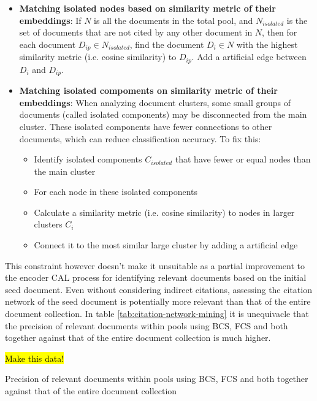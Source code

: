 \documentclass[10pt, english]{article}
\begin{document}
\begin{itemize}
    \item \textbf{Matching isolated nodes based on similarity metric of their embeddings}: If $N$ is all the documents in the total pool, and $N_{isolated}$ is the set of documents that are not cited by any other document in $N$, then for each document $D_{ip} \in N_{isolated}$, find the document $D_i \in N$ with the highest similarity metric (i.e. cosine similarity) to $D_{ip}$. Add a artificial edge between $D_i$ and $D_{ip}$.
    \item \textbf{Matching isolated compoments on similarity metric of their embeddings}: When analyzing document clusters, some small groups of documents (called isolated components) may be disconnected from the main cluster. These isolated components have fewer connections to other documents, which can reduce classification accuracy. To fix this:
    \begin{itemize}
        \item Identify isolated components $C_{isolated}$ that have fewer or equal nodes than the main cluster
        \item For each node in these isolated components
        \item Calculate a similarity metric (i.e. cosine similarity) to nodes in larger clusters $C_i$
        \item Connect it to the most similar large cluster by adding a artificial edge
    \end{itemize}

\end{itemize}

This constraint however doesn't make it unsuitable as a partial improvement to the encoder CAL process for identifying relevant documents based on the initial seed document. Even without considering indirect citations, assessing the citation network of the seed document is potentially more relevant than that of the entire document collection. In table \ref{tab:citation-network-mining} it is unequivacle that the precision of relevant documents within pools using BCS, FCS  and both together against that of the entire document collection is much higher.

\hl{Make this data!}

\begin{table}[h]
    \centering
    \caption{Precision of relevant documents within pools using BCS, FCS and both together against that of the entire document collection}
    \label{tab:citation-network-mining}
\end{table}
\end{document}

